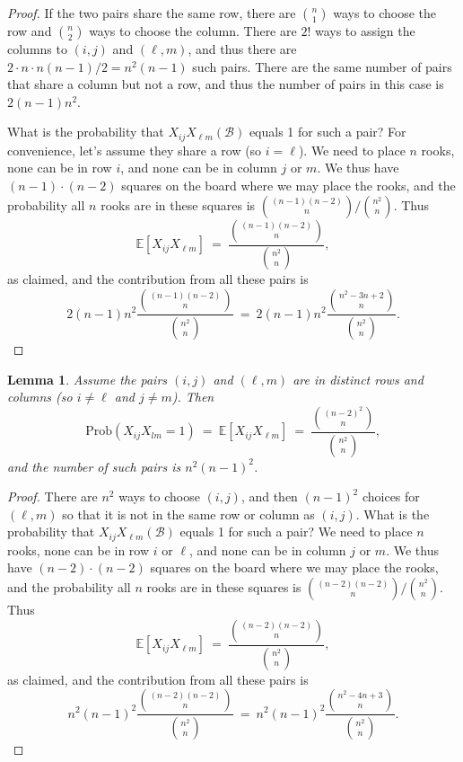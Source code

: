 \documentclass[12pt,reqno]{amsart}
\newcommand{\E}{\mathbb{E}}
\renewcommand{\E}{\mathbb{E}}
\numberwithin{equation}{section}
\newtheorem{lem}[thm]{Lemma}
\theoremstyle{plain}
\newcommand\be{\begin{equation}}
\newcommand\ee{\end{equation}}
\newcommand{\ncr}[2]{{#1 \choose #2}}
\begin{document}
\begin{proof}
If the two pairs share the same row, there are $\ncr{n}{1}$ ways to choose the row and $\ncr{n}{2}$ ways to choose the column. There are $2!$ ways to assign the columns to $(i,j)$ and $(\ell, m)$, and thus there are $2 \cdot n \cdot n(n-1)/2 = n^2(n-1)$ such pairs. There are the same number of pairs that share a column but not a row, and thus the number of pairs in this case is $2(n-1)n^2$.

What is the probability that $X_{ij} X_{\ell m}(\mathcal{B})$ equals 1 for such a pair? For convenience, let's assume they share a row (so $i=\ell$). We need to place $n$ rooks, none can be in row $i$, and none can be in column $j$ or $m$. We thus have $(n-1) \cdot (n-2)$ squares on the board where we may place the rooks, and the probability all $n$ rooks are in these squares is $\ncr{(n-1)(n-2)}{n} / \ncr{n^2}{n}$. Thus \be \E[X_{ij} X_{\ell m}] \ = \ \frac{\ncr{(n-1)(n-2)}{n}}{\ncr{n^2}{n}}, \ee as claimed, and the contribution from all these pairs is \be 2(n-1)n^2 \frac{\ncr{(n-1)(n-2)}{n}}{\ncr{n^2}{n}} \ = \ 2(n-1)n^2 \frac{\ncr{n^2-3n+2}{n}}{\ncr{n^2}{n}}. \ee
\end{proof}

\begin{lem}\label{lem:pairsnooverlap} Assume the pairs $(i,j)$ and $(\ell, m)$ are in distinct rows and columns (so $i \neq \ell$ and $j \neq m$). Then \be
    \text{Prob}\left(X_{ij}X_{lm} = 1\right)\ =\ \E[X_{ij}X_{\ell m}]\ =\ \frac{\ncr{(n-2)^2}{n}}{\ncr{n^2}{n}},
 \ee and the number of such pairs is $n^2 (n-1)^2$. \end{lem}

\begin{proof} There are $n^2$ ways to choose $(i,j)$, and then $(n - 1)^2$ choices for $(\ell, m)$ so that it is not in the same row or column as $(i,j)$. What is the probability that $X_{ij} X_{\ell m}(\mathcal{B})$ equals 1 for such a pair? We need to place $n$ rooks, none can be in row $i$ or $\ell$, and none can be in column $j$ or $m$. We thus have $(n-2) \cdot (n-2)$ squares on the board where we may place the rooks, and the probability all $n$ rooks are in these squares is $\ncr{(n-2)(n-2)}{n} / \ncr{n^2}{n}$. Thus \be \E[X_{ij} X_{\ell m}] \ = \ \frac{\ncr{(n-2)(n-2)}{n}}{\ncr{n^2}{n}}, \ee as claimed, and the contribution from all these pairs is \be n^2(n-1)^2 \frac{\ncr{(n-2)(n-2)}{n}}{\ncr{n^2}{n}} \ = \ n^2(n-1)^2 \frac{\ncr{n^2-4n+3}{n}}{\ncr{n^2}{n}}. \ee
\end{proof}
\end{document}
